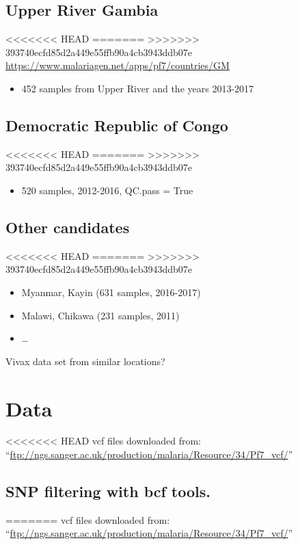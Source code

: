 \documentclass[11pt]{article}
\begin{document}
\subsection{Upper River Gambia}
<<<<<<< HEAD
\label{sec:org7007c7e}
=======
\label{sec:orgcde26b5}
>>>>>>> 393740ecfd85d2a449e55ffb90a4cb3943ddb07e
\url{https://www.malariagen.net/apps/pf7/countries/GM}
\begin{itemize}
\item 452 samples from Upper River and the years 2013-2017
\end{itemize}

\subsection{Democratic Republic of Congo}
<<<<<<< HEAD
\label{sec:orgbe92b72}
=======
\label{sec:orgf4f4067}
>>>>>>> 393740ecfd85d2a449e55ffb90a4cb3943ddb07e
\begin{itemize}
\item 520 samples, 2012-2016, QC.pass = True
\end{itemize}

\subsection{Other candidates}
<<<<<<< HEAD
\label{sec:org839d17e}
=======
\label{sec:org776838f}
>>>>>>> 393740ecfd85d2a449e55ffb90a4cb3943ddb07e
\begin{itemize}
\item Myanmar, Kayin (631 samples, 2016-2017)
\item Malawi, Chikawa (231 samples, 2011)
\item \ldots{}
\end{itemize}
Vivax data set from similar locations?

\section{Data}
<<<<<<< HEAD
\label{sec:orgc2084c4}
vcf files downloaded from: ``\url{ftp://ngs.sanger.ac.uk/production/malaria/Resource/34/Pf7\_vcf/}''

\subsection{SNP filtering with bcf tools.}
\label{sec:org3493bee}
=======
\label{sec:orgdf9091d}
vcf files downloaded from: ``\url{ftp://ngs.sanger.ac.uk/production/malaria/Resource/34/Pf7\_vcf/}''
\end{document}

